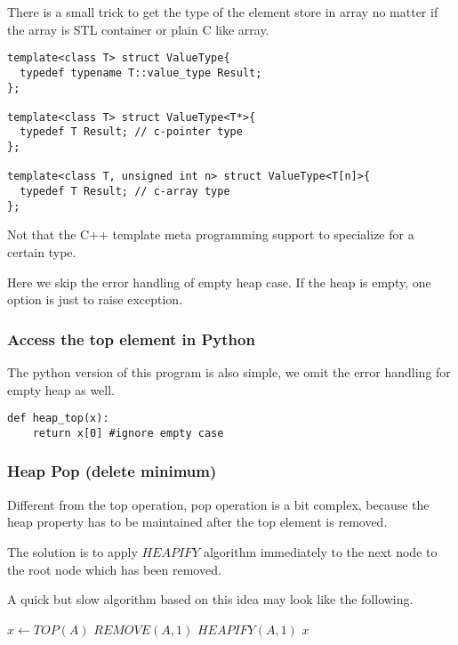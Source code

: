 \documentclass{article}
\begin{document}
There is a small trick to get the type of the element store in 
array no matter if the array is STL container or plain C like
array.

\begin{lstlisting}
template<class T> struct ValueType{
  typedef typename T::value_type Result;
};

template<class T> struct ValueType<T*>{
  typedef T Result; // c-pointer type
};

template<class T, unsigned int n> struct ValueType<T[n]>{
  typedef T Result; // c-array type
};
\end{lstlisting}

Not that the C++ template meta programming support to
specialize for a certain type.

Here we skip the error handling of empty heap case. If the 
heap is empty, one option is just to raise exception.

\subsubsection*{Access the top element in Python}

The python version of this program is also simple, we omit
the error handling for empty heap as well.

\lstset{language=C++}
\begin{lstlisting}
def heap_top(x):
    return x[0] #ignore empty case
\end{lstlisting}

\subsubsection{Heap Pop (delete minimum)}

Different from the top operation, pop operation is a bit
complex, because the heap property has to be maintained
after the top element is removed.

The solution is to apply $HEAPIFY$ algorithm immediately to the
next node to the root node which has been removed.

A quick but slow algorithm based on this idea may look like
the following.

\begin{algorithmic}[1]
  \State $x \gets TOP(A)$
  \State $REMOVE(A, 1)$
    \State $HEAPIFY(A, 1)$
  \EndIf
  \State \Return $x$
\EndFunction
\end{algorithmic}
\end{document}
